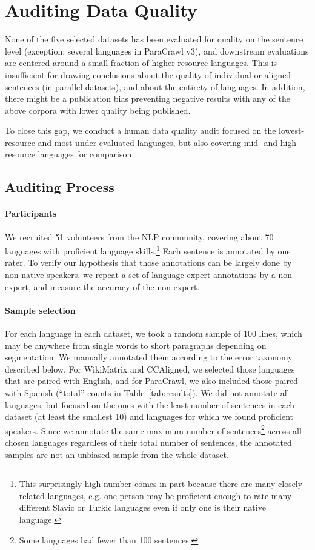 \section{Auditing Data Quality}\label{sec:audit}
None of the five selected datasets has been evaluated for quality on the sentence level (exception: several languages in ParaCrawl v3), and downstream evaluations are centered around a small fraction of higher-resource languages. This is insufficient for drawing conclusions about the quality of individual or aligned sentences (in parallel datasets), and about the entirety of languages. In addition, there might be a publication bias preventing negative results with any of the above corpora with lower quality being published.

To close this gap, we conduct a human data quality audit focused on the lowest-resource and most under-evaluated languages, but also covering mid- and high-resource languages for comparison.

\subsection{Auditing Process}

\paragraph{Participants} We recruited 51 volunteers from the NLP community, covering about 70 languages with proficient language skills.\footnote{This surprisingly high number comes in part because there are many closely related languages, e.g. one person may be proficient enough to rate many different Slavic or Turkic languages even if only one is their native language.} Each sentence is annotated by one rater.
To verify our hypothesis that those annotations can be largely done by non-native speakers, we repeat a set of language expert annotations by a non-expert, and measure the accuracy of the non-expert.

\paragraph{Sample selection} For each language in each dataset, we took a random sample of 100 lines, which may be anywhere from single words to short paragraphs depending on segmentation.
We manually annotated them according to the error taxonomy described below. For WikiMatrix and CCAligned, we selected those languages that are paired with English, and for ParaCrawl, we also included those paired with Spanish (``total'' counts in Table~\ref{tab:results}).
We did not annotate all languages, but focused on the ones with the least number of sentences in each dataset (at least the smallest 10) and languages for which we found proficient speakers.
Since we annotate the same maximum number of sentences\footnote{Some languages had fewer than 100 sentences.} across all chosen languages regardless of their total number of sentences, the annotated samples are not an unbiased sample from the whole dataset.

